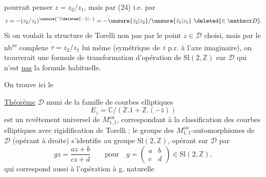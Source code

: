   pourrait penser $z=z_2/z_1$,  mais par (24) i.e. par
\[
 z=-(z_2/z_1)^{\unsure{\overline{\phantom z}|\deleted{-}|-}}=-\unsure{\bar z_2|z_2}/\unsure{\bar z_1|z_1}\ \deleted{\in\mathscr D}.
\]
Si  on voulait  la structure de Torelli non pas par le point $z\in\mathscr D$ choisi, mais par le nb\textsuperscript{re} complexe $\tau=z_2/z_1$ lui même (symétrique de $z$ p.r. à l'axe imaginaire), on trouverait une formule de transformation d'opération de $\mathrm{Sl}(2,\mathbb Z)$ sur $\mathscr D$ qui n'est \uline{pas} la formule habituelle.


On trouve ici le

\uline{Théorème} \quad $\mathscr D$  muni de la famille  de courbes elliptiques 
\[
 E_z=\mathbb C/(\mathbb Z.1+\mathbb Z.(-\bar z))
\]
est un revêtement universel de $M_{1,1}^{\mathrm{an}}$, correspondant à la classification des courbes elliptiques avec rigidification de Torelli ; le groupe des $M_{1,1}^{\mathrm{an}}$-automorphismes de $\mathscr D$ (opérant à droite) s'identifie au groupe $\mathrm{Sl}(2,\mathbb Z)$, opérant sur $\mathscr D$ par
\[
 gz=\frac{az+b}{cz+d}\qquad\text{pour}\quad g=\begin{pmatrix}a&b\\c&d\end{pmatrix}\in\mathrm{Sl}(2,\mathbb Z),
\]
qui correspond aussi à l'opération à g. naturelle
